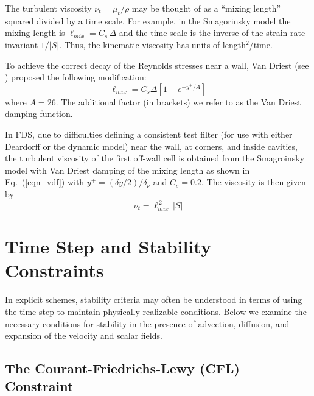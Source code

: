 The turbulent viscosity $\nu_t = \mu_t/\rho$ may be thought of as a ``mixing length'' squared divided by a time scale.  For example, in the Smagorinsky model the mixing length is $\ell_{mix} = C_s \,\Delta$ and the time scale is the inverse of the strain rate invariant $1/|S|$.  Thus, the kinematic viscosity has units of length$^2$/time.

To achieve the correct decay of the Reynolds stresses near a wall, Van Driest (see \cite{Wilcox:1}) proposed the following modification:
\begin{equation}
\label{eqn_vdf}
\ell_{mix} = C_s \Delta \left[ 1 - e^{-y^+/A} \right]
\end{equation}
where $A=26$.  The additional factor (in brackets) we refer to as the Van Driest damping function.

In FDS, due to difficulties defining a consistent test filter (for use with either Deardorff or the dynamic model) near the wall, at corners, and inside cavities, the turbulent viscosity of the first off-wall cell is obtained from the Smagroinsky model with Van Driest damping of the mixing length as shown in Eq.~(\ref{eqn_vdf}) with $y^+ = (\delta y/2)/\delta_\nu$ and $C_s = 0.2$.  The viscosity is then given by\begin{equation}
\label{eqn_nearwall_viscosity}
\nu_t = \ell_{mix}^{\,2}\,|S|
\end{equation}

\newpage

\section{Time Step and Stability Constraints}

\label{stability}

In explicit schemes, stability criteria may often be understood in terms of using the time step to maintain physically realizable conditions.  Below we examine the necessary conditions for stability in the presence of advection, diffusion, and expansion of the velocity and scalar fields.

\subsection{The Courant-Friedrichs-Lewy (CFL) Constraint}

